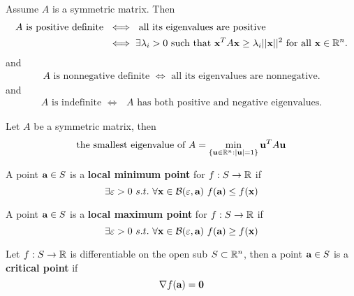 \documentclass[11pt]{article}
\begin{document}
			\begin{theorem}
				Assume $A$ is a symmetric matrix. Then
				\begin{align}
					A\mbox{ is positive definite }
					&\iff \mbox{ all its eigenvalues are positive }\nonumber \\
					&\iff \exists\lambda_i>0\mbox{ such that }\textbf{x}^T A\textbf{x} \geq \lambda_i \vert \vert {\textbf{x}} \vert \vert^2 \mbox{ for all }\textbf{x}\in \mathbb{R}^n.\nonumber
				\end{align}
				and
				\begin{align}
					A\mbox{ is nonnegative definite } \iff \mbox{ all its eigenvalues are nonnegative.}
				\end{align}
				and 
				\begin{align}
					A\mbox{ is indefinite } \iff \mbox{ $A$ has both positive and negative eigenvalues.}
				\end{align}
			\end{theorem}
			
			\begin{lemma}
				Let $A$ be a symmetric matrix, then
				\begin{equation}
					\mbox{the smallest eigenvalue of }A = \min_{\{\textbf{u}\in \mathbb{R}^n : |\textbf{u}|=1\} } \textbf{u}^T A\textbf{u}
				\end{equation}
			\end{lemma}
			
			\begin{definition}
				A point $\textbf{a} \in S$ is a \textbf{local minimum point} for $f: S \to \mathbb{R}$ if 
				\begin{equation}
					\exists \varepsilon > 0\ s.t.\ \forall \textbf{x} \in \mathcal{{B}}(\varepsilon, \textbf{a})\ f(\textbf{a}) \leq f(\textbf{x})
				\end{equation}
			\end{definition}
			
			\begin{definition}
				A point $\textbf{a} \in S$ is a \textbf{local maximum point} for $f: S \to \mathbb{R}$ if 
				\begin{equation}
					\exists \varepsilon > 0\ s.t.\ \forall \textbf{x} \in \mathcal{{B}}(\varepsilon, \textbf{a})\ f(\textbf{a}) \geq f(\textbf{x})
				\end{equation}
			\end{definition}
			
			\begin{definition}
				Let $f: S \to \mathbb{R}$ is differentiable on the open sub $S \subset \mathbb{R}^n$, then a point $\textbf{a} \in S$ is a \textbf{critical point} if 
				\begin{equation}
					\nabla f(\textbf{a}) = \textbf{0}
				\end{equation}
			\end{definition}
			
\end{document}
